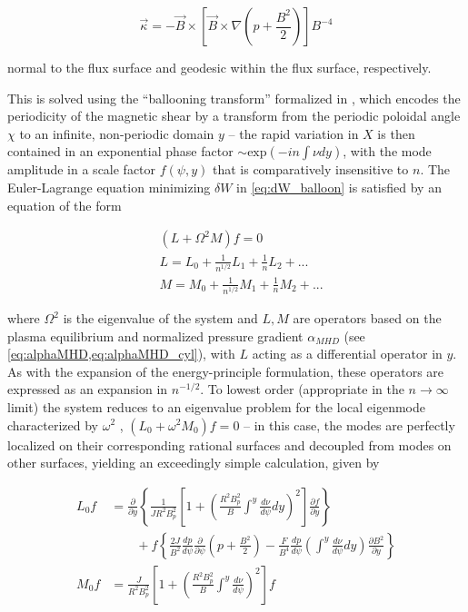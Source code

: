 \begin{equation}\label{eq:kappa}
 \vec{\kappa} = -\vec{B} \times \left[ \vec{B} \times \nabla \left( p + \frac{B^2}{2} \right) \right] B^{-4}
\end{equation}

\noindent normal to the flux surface and geodesic within the flux surface, respectively.

This is solved using the ``ballooning transform'' formalized in \cite{Connor1978}, which encodes the periodicity of the magnetic shear by a transform from the periodic poloidal angle $\chi$ to an infinite, non-periodic domain $y$ -- the rapid variation in $X$ is then contained in an exponential phase factor $\sim \mbox{exp}(-in\int \nu dy)$, with the mode amplitude in a scale factor $f(\psi,y)$ that is comparatively insensitive to $n$.  The Euler-Lagrange equation minimizing $\delta W$ in \cref{eq:dW_balloon} is satisfied by an equation of the form

\begin{equation}\label{eq:baloo}
 \begin{aligned}
  &\left( L + \Omega^2 M \right) f = 0\\
  &L = L_0 + \frac{1}{n^{1/2}} L_1 + \frac{1}{n} L_2 + ...\\
  &M = M_0 + \frac{1}{n^{1/2}} M_1 + \frac{1}{n} M_2 + ...
 \end{aligned}
\end{equation}

\noindent where $\Omega^2$ is the eigenvalue of the system and $L,M$ are operators based on the plasma equilibrium and normalized pressure gradient $\alpha_{MHD}$ (see \cref{eq:alphaMHD,eq:alphaMHD_cyl}), with $L$ acting as a differential operator in $y$.  As with the expansion of the energy-principle formulation, these operators are expressed as an expansion in $n^{-1/2}$.  To lowest order (appropriate in the $n \rightarrow \infty$ limit) the system reduces to an eigenvalue problem for the local eigenmode characterized by $\omega^2$ \cite{Connor1979}, $(L_0 + \omega^2 M_0)f = 0$ -- in this case, the modes are perfectly localized on their corresponding rational surfaces and decoupled from modes on other surfaces, yielding an exceedingly simple calculation, given by

\begin{equation}\label{eq:baloo2}
 \begin{aligned}
  L_0 f &= \frac{\partial}{\partial y} \left\{ \frac{1}{JR^2 B_p^2} \left[ 1 + \left( \frac{R^2 B_p^2}{B} \int^y \frac{d\nu}{d\psi} dy \right)^2 \right] \frac{\partial f}{\partial y} \right\}\\
  &\qquad + f \left\{ \frac{2J}{B^2} \frac{dp}{d\psi} \frac{\partial}{\partial \psi} \left( p + \frac{B^2}{2} \right) - \frac{F}{B^4} \frac{dp}{d\psi} \left( \int^y \frac{d\nu}{d\psi} dy \right) \frac{\partial B^2}{\partial y} \right\}\\
  M_0 f &= \frac{J}{R^2 B_p^2} \left[ 1 + \left( \frac{R^2 B_p^2}{B} \int^y \frac{d\nu}{d\psi} \right)^2 \right] f
 \end{aligned}
\end{equation}

